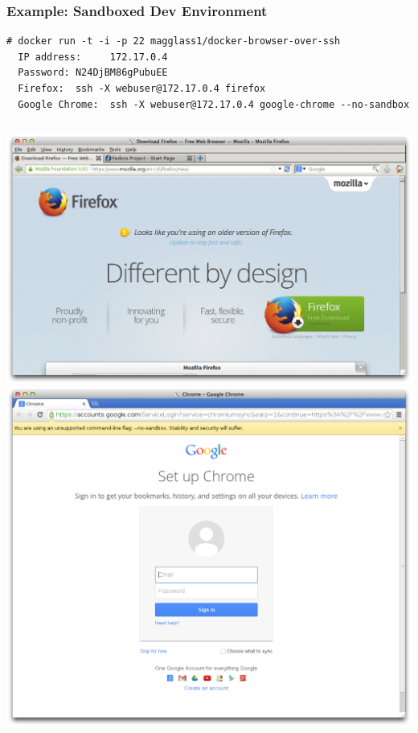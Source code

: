 \documentclass[xcolor=dvipsnames]{beamer}
\begin{document}
\begin{frame}[fragile]
  \frametitle{Example: Sandboxed Dev Environment}
  \begin{lstlisting}[basicstyle=\tiny]
  # docker run -t -i -p 22 magglass1/docker-browser-over-ssh
  IP address:     172.17.0.4
  Password: N24DjBM86gPubuEE
  Firefox:  ssh -X webuser@172.17.0.4 firefox
  Google Chrome:  ssh -X webuser@172.17.0.4 google-chrome --no-sandbox
  \end{lstlisting}
  \begin{columns}
  \includegraphics[width=\textwidth]{figures/firefox.png}
  \includegraphics[width=\textwidth]{figures/chrome.png}
  \end{columns}
\end{frame}
\end{document}
